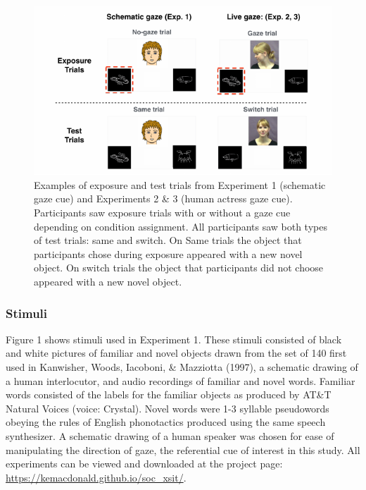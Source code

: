\documentclass[a4paper,man,floatsintext]{apa6}
\newenvironment{CodeChunk}{}{}
\begin{document}
\begin{CodeChunk}
\begin{figure}[tb]
\includegraphics{figs/stimuli-1} \caption[Examples of exposure and test trials from Experiment 1 (schematic gaze cue) and Experiments 2 \& 3 (human actress gaze cue)]{Examples of exposure and test trials from Experiment 1 (schematic gaze cue) and Experiments 2 \& 3 (human actress gaze cue). Participants saw exposure trials with or without a gaze cue depending on condition assignment. All participants saw both types of test trials: same and switch. On Same trials the object that participants chose during exposure appeared with a new novel object. On switch trials the object that participants did not choose appeared with a new novel object.}\label{fig:stimuli}
\end{figure}
\end{CodeChunk}

\subsubsection{Stimuli}\label{stimuli}

Figure 1 shows stimuli used in Experiment 1. These stimuli consisted of
black and white pictures of familiar and novel objects drawn from the
set of 140 first used in Kanwisher, Woods, Iacoboni, \& Mazziotta
(1997), a schematic drawing of a human interlocutor, and audio
recordings of familiar and novel words. Familiar words consisted of the
labels for the familiar objects as produced by AT\&T Natural Voices
\texttrademark (voice: Crystal). Novel words were 1-3 syllable
pseudowords obeying the rules of English phonotactics produced using the
same speech synthesizer. A schematic drawing of a human speaker was
chosen for ease of manipulating the direction of gaze, the referential
cue of interest in this study. All experiments can be viewed and
downloaded at the project page:
\url{https://kemacdonald.github.io/soc_xsit/}.
\end{document}
